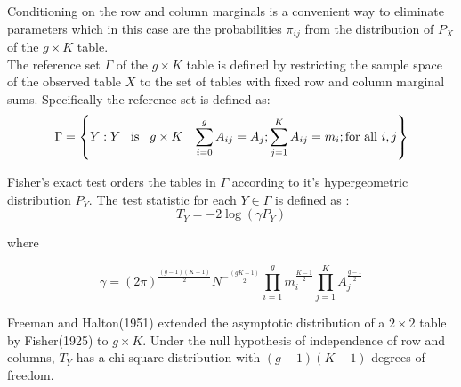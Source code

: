 \documentclass[12pt,oneside]{report}
\theoremstyle{definition}
\theoremstyle{mystyle}
\begin{document}
Conditioning on the row and column marginals is a convenient way to eliminate  parameters which in this case are the probabilities $\pi_{ij}$ from the distribution of $P_{X}$ of the $g\times K$ table.\\
The reference set $\Gamma$ of the $g\times K$ table is defined by restricting the sample space of the observed table $X$ to the set of tables with fixed row and column marginal sums. Specifically the reference set is defined as:
\begin{equation*}
\Gamma=\left\{Y:Y  \hspace{3mm} \text{is}\hspace{3mm} g\times K\hspace{3mm}\sum\limits_{i=0}^{g}A_{ij}=A_{j};\sum\limits_{j=1}^{K}A_{ij}=m_{i};\text{for all }i,j\right \}
\end{equation*}

Fisher's exact test orders the tables in $\Gamma$ according to it's hypergeometric distribution $P_{Y}$. The test statistic for each  $Y \in \Gamma$ is defined as  \cite{mehta1992}:
\begin{equation*}
T_{Y}=-2\log( \gamma P_{Y} )
\end{equation*}

where

\begin{equation*}
\gamma=(2\pi)^{\frac{(g-1)(K-1)}{2}}N^{-\frac{(gK-1)}{2}}\prod\limits_{i=1}^{g}m_{i}
^{\frac{K-1}{2}}\prod\limits_{j=1}^{K}A_{j}
^{\frac{g-1}{2}}
\end{equation*}

Freeman and Halton(1951) extended the  asymptotic distribution of a $2\times2$  table  by Fisher(1925) to $g\times K$. Under the null hypothesis of independence of row and columns, $T_{Y}$ has a  chi-square distribution with $(g-1)(K-1)$ degrees of freedom.
\end{document}
